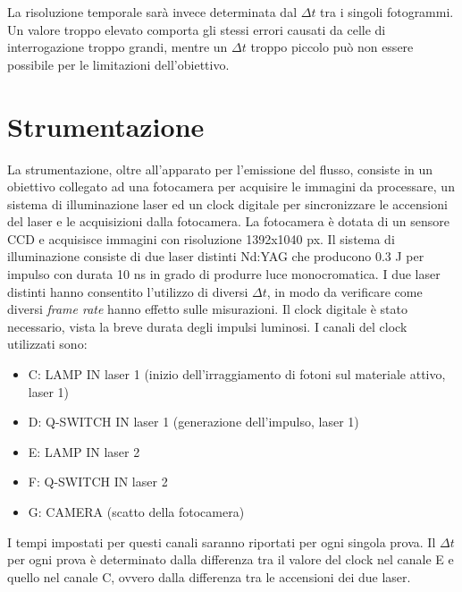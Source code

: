\documentclass{article} %
\begin{document}
La risoluzione temporale sarà invece determinata dal $\Delta t$ tra i singoli fotogrammi. Un valore troppo elevato comporta gli stessi errori causati da celle di interrogazione troppo grandi, mentre un $\Delta t$ troppo piccolo può non essere possibile per le limitazioni dell'obiettivo.

\section{Strumentazione}
La strumentazione, oltre all'apparato per l'emissione del flusso, consiste in un obiettivo collegato ad una fotocamera per acquisire le immagini da processare, un sistema di illuminazione laser ed un clock digitale per sincronizzare le accensioni del laser e le acquisizioni dalla fotocamera. La fotocamera è dotata di un sensore CCD e acquisisce immagini con risoluzione 1392x1040 px. Il sistema di illuminazione consiste di due laser distinti Nd:YAG che producono 0.3 J per impulso con durata 10 ns in grado di produrre luce monocromatica. I due laser distinti hanno consentito l'utilizzo di diversi $\Delta t$, in modo da verificare come diversi \textit{frame rate} hanno effetto sulle misurazioni. Il clock digitale è stato necessario, vista la breve durata degli impulsi luminosi. I canali del clock utilizzati sono:
\begin{itemize} \itemsep0em
	\item C: LAMP IN laser 1 (inizio dell'irraggiamento di fotoni sul materiale attivo, laser 1)
	\item D: Q-SWITCH IN laser 1 (generazione dell'impulso, laser 1)
	\item E: LAMP IN laser 2
	\item F: Q-SWITCH IN laser 2
	\item G: CAMERA (scatto della fotocamera)
\end{itemize}
I tempi impostati per questi canali saranno riportati per ogni singola prova. Il $\Delta t$ per ogni prova è determinato dalla differenza tra il valore del clock nel canale E e quello nel canale C, ovvero dalla differenza tra le accensioni dei due laser.
\end{document}
